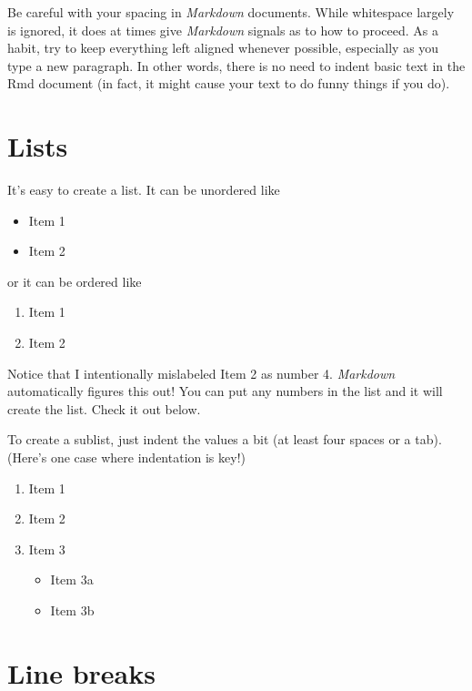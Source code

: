 \documentclass[12pt,twoside]{reedthesis}
\providecommand{\tightlist}{%
  \setlength{\itemsep}{0pt}\setlength{\parskip}{0pt}}
\begin{document}
  Be careful with your spacing in \emph{Markdown} documents. While
  whitespace largely is ignored, it does at times give \emph{Markdown}
  signals as to how to proceed. As a habit, try to keep everything left
  aligned whenever possible, especially as you type a new paragraph. In
  other words, there is no need to indent basic text in the Rmd document
  (in fact, it might cause your text to do funny things if you do).
  
  \section{Lists}\label{lists}
  
  It's easy to create a list. It can be unordered like
  
  \begin{itemize}
  \tightlist
  \item
    Item 1
  \item
    Item 2
  \end{itemize}
  
  or it can be ordered like
  
  \begin{enumerate}
  \def\labelenumi{\arabic{enumi}.}
  \tightlist
  \item
    Item 1
  \item
    Item 2
  \end{enumerate}
  
  Notice that I intentionally mislabeled Item 2 as number 4.
  \emph{Markdown} automatically figures this out! You can put any numbers
  in the list and it will create the list. Check it out below.
  
  To create a sublist, just indent the values a bit (at least four spaces
  or a tab). (Here's one case where indentation is key!)
  
  \begin{enumerate}
  \def\labelenumi{\arabic{enumi}.}
  \tightlist
  \item
    Item 1
  \item
    Item 2
  \item
    Item 3
  
    \begin{itemize}
    \tightlist
    \item
      Item 3a
    \item
      Item 3b
    \end{itemize}
  \end{enumerate}
  
  \section{Line breaks}\label{line-breaks}
  
\end{document}
